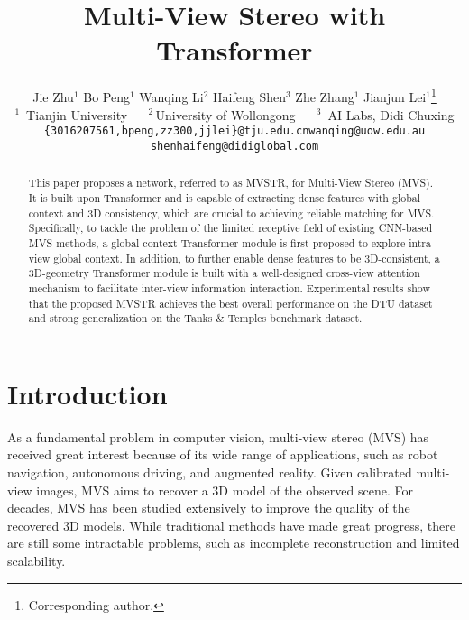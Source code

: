 \documentclass[10pt,twocolumn,letterpaper]{article}
\begin{document}
\title{Multi-View Stereo with Transformer}

\author{{Jie Zhu{$^{1}$}} \quad Bo Peng{$^{1}$} \quad  Wanqing Li{$^{2}$} \quad  Haifeng Shen{$^{3}$} \quad Zhe Zhang{$^{1}$} \quad Jianjun Lei{$^{1}$}\thanks{Corresponding author.}\\
	\normalsize
	$^{1}$\	Tianjin University ~~ $^{2}$\,University of Wollongong ~~ $^{3}$\ AI Labs, Didi Chuxing\\
	\normalsize
	{\tt\small  \{3016207561,bpeng,zz300,jjlei\}@tju.edu.cn\quad wanqing@uow.edu.au\quad
		shenhaifeng@didiglobal.com}
}

\maketitle

\begin{abstract}
   This paper proposes a network, referred to as MVSTR, for Multi-View Stereo (MVS). It is built upon Transformer and is capable of extracting dense features with global context and 3D consistency, which are crucial to achieving reliable matching for MVS. Specifically, to tackle the problem of the limited receptive field of existing CNN-based MVS methods, a global-context Transformer module is first proposed to explore intra-view global context. In addition, to further enable dense features to be 3D-consistent, a 3D-geometry Transformer module is built with a well-designed cross-view attention mechanism to facilitate inter-view information interaction. Experimental results show that the proposed MVSTR achieves the best overall performance on the DTU dataset and strong generalization on the Tanks \& Temples benchmark dataset.
\end{abstract}

\section{Introduction}

As a fundamental problem in computer vision, multi-view stereo (MVS) has received great interest because of its wide range of applications, such as robot navigation, autonomous driving, and augmented reality. Given calibrated multi-view images, MVS aims to recover a 3D model of the observed scene. For decades, MVS has been studied extensively to improve the quality of the recovered 3D models. While traditional methods \cite{tola,camp,furu,gipuma,colmap,acmm} have made great progress, there are still some intractable problems, such as incomplete reconstruction and limited scalability.
\end{document}
